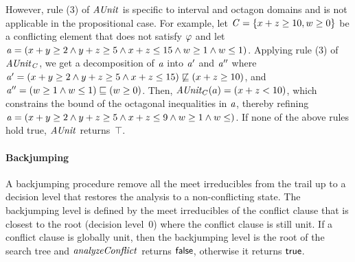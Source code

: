 However, rule (3) of $\mathit{AUnit}$ is specific to interval and octagon domains 
and is not applicable in the propositional case.  
For example, let $\mathit{C} = \{ x+z \geq 10, w \geq 0 \}$ 
be a conflicting element that does not satisfy $\varphi$ 
and let $\mathit{a}= (x+y \geq 2\wedge y+z \geq 5\wedge x+z \leq 15\wedge w \geq 1\wedge w \leq
1)$.  Applying rule (3) of $\mathit{AUnit}_{\mathit{C}}$, we get a
decomposition of $\mathit{a}$ into $\mathit{a}'$ and $\mathit{a}''$ where
$\mathit{a}'= (x+y \geq 2\wedge y+z \geq 5\wedge x+z \leq 15)
\not\sqsubseteq (x+z \geq 10)$, and $\mathit{a}''= (w \geq 1\wedge w \leq
1) \sqsubseteq (w \geq 0)$.  Then, $\mathit{AUnit}_C(a) = (x+z < 10)$, which
constrains the bound of the octagonal inequalities in $\mathit{a}$, thereby 
refining $\mathit{a} = (x+y \geq 2\wedge y+z \geq 5 \wedge x+z \leq 9 
\wedge w \geq 1\wedge w \leq)$.  If none of the above rules hold true, 
$\mathit{AUnit}$ returns~$\top$.

\paragraph {\textbf{Backjumping}}
A backjumping procedure remove all the meet irreducibles from 
the trail up to a decision level that restores the analysis to a
non-conflicting state.  The backjumping level is defined by the
meet irreducibles of the conflict clause that is closest 
to the root (decision level~0) where the conflict
clause is still unit.  If a conflict clause is globally unit, then the
backjumping level is the root of the search tree and
$\mathit{analyzeConflict}$ returns $\mathsf{false}$, otherwise it returns $\mathsf{true}$.


